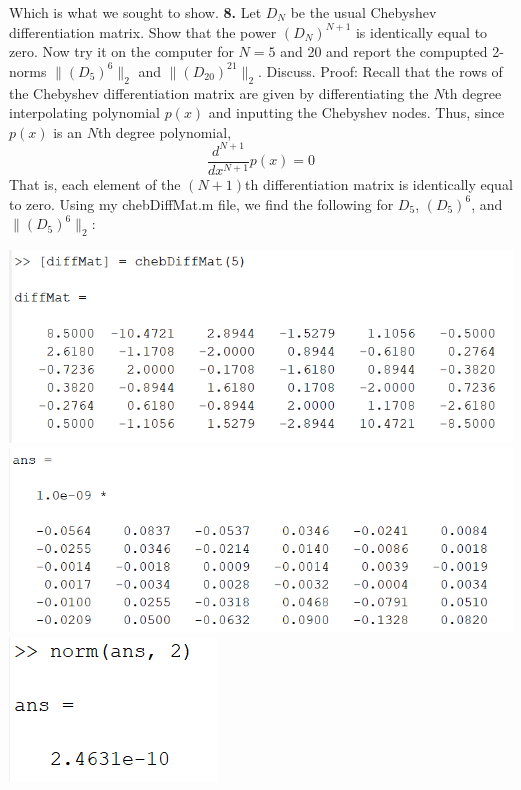 \documentclass{article}
\begin{document}
Which is what we sought to show.
\newline\newline\newline
\textbf{8.} Let $D_N$ be the usual Chebyshev differentiation matrix. Show that the power $(D_N)^{N+1}$ is identically equal to zero. Now try it on the computer for $N=5$ and 20 and report the compupted 2-norms $\|(D_5)^6\|_2$ and $\|(D_{20})^{21}\|_2$. Discuss.
\newline\newline
Proof: Recall that the rows of the Chebyshev differentiation matrix are given by differentiating the $N$th degree interpolating polynomial $p(x)$ and inputting the Chebyshev nodes. Thus, since $p(x)$ is an $N$th degree polynomial,
\[\frac{d^{N+1}}{dx^{N+1}}p(x) = 0\]
That is, each element of the $(N+1)$th differentiation matrix is identically equal to zero.
\newline\newline
Using my chebDiffMat.m file, we find the following for $D_5$, $(D_5)^6$, and $\|(D_5)^6\|_2$:
\begin{center}
    \includegraphics[scale = 0.75]{6_8_cheb5}
    \newline
    \includegraphics[scale = 0.65]{6_8_cheb5_nil}
    \includegraphics[scale = 0.7]{6_8_cheb5_svd}
\end{center}
\end{document}
